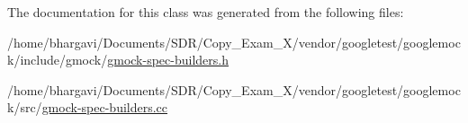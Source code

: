 The documentation for this class was generated from the following files\+:\begin{DoxyCompactItemize}
\item 
/home/bhargavi/\+Documents/\+S\+D\+R/\+Copy\+\_\+\+Exam\+\_\+X/vendor/googletest/googlemock/include/gmock/\hyperlink{gmock-spec-builders_8h}{gmock-\/spec-\/builders.\+h}\item 
/home/bhargavi/\+Documents/\+S\+D\+R/\+Copy\+\_\+\+Exam\+\_\+X/vendor/googletest/googlemock/src/\hyperlink{gmock-spec-builders_8cc}{gmock-\/spec-\/builders.\+cc}\end{DoxyCompactItemize}
